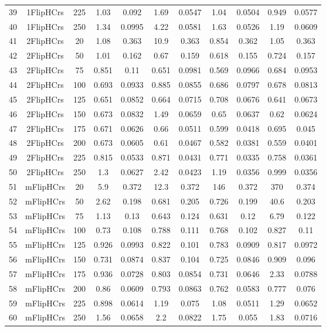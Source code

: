 \begin{table}[hbtp]
\begin{tabular}{|ccccccccccc|}
  39 & 1FlipHCrs &  225 & 1.03 & 0.092 & 1.69 & 0.0547 & 1.04 & 0.0504 & 0.949 & 0.0577 \\
  40 & 1FlipHCrs &  250 & 1.34 & 0.0995 & 4.22 & 0.0581 & 1.63 & 0.0526 & 1.19 & 0.0609 \\
  41 & 2FlipHCrs &   20 & 1.08 & 0.363 & 10.9 & 0.363 & 0.854 & 0.362 & 1.05 & 0.363 \\
  42 & 2FlipHCrs &   50 & 1.01 & 0.162 & 0.67 & 0.159 & 0.618 & 0.155 & 0.724 & 0.157 \\
  43 & 2FlipHCrs &   75 & 0.851 & 0.11 & 0.651 & 0.0981 & 0.569 & 0.0966 & 0.684 & 0.0953 \\
  44 & 2FlipHCrs &  100 & 0.693 & 0.0933 & 0.885 & 0.0855 & 0.686 & 0.0797 & 0.678 & 0.0813 \\
  45 & 2FlipHCrs &  125 & 0.651 & 0.0852 & 0.664 & 0.0715 & 0.708 & 0.0676 & 0.641 & 0.0673 \\
  46 & 2FlipHCrs &  150 & 0.673 & 0.0832 & 1.49 & 0.0659 & 0.65 & 0.0637 & 0.62 & 0.0624 \\
  47 & 2FlipHCrs &  175 & 0.671 & 0.0626 & 0.66 & 0.0511 & 0.599 & 0.0418 & 0.695 & 0.045 \\
  48 & 2FlipHCrs &  200 & 0.673 & 0.0605 & 0.61 & 0.0467 & 0.582 & 0.0381 & 0.559 & 0.0401 \\
  49 & 2FlipHCrs &  225 & 0.815 & 0.0533 & 0.871 & 0.0431 & 0.771 & 0.0335 & 0.758 & 0.0361 \\
  50 & 2FlipHCrs &  250 &  1.3 & 0.0627 & 2.42 & 0.0423 & 1.19 & 0.0356 & 0.999 & 0.0356 \\
  51 & mFlipHCrs &   20 &  5.9 & 0.372 & 12.3 & 0.372 &  146 & 0.372 &  370 & 0.374 \\
  52 & mFlipHCrs &   50 & 2.62 & 0.198 & 0.681 & 0.205 & 0.726 & 0.199 & 40.6 & 0.203 \\
  53 & mFlipHCrs &   75 & 1.13 & 0.13 & 0.643 & 0.124 & 0.631 & 0.12 & 6.79 & 0.122 \\
  54 & mFlipHCrs &  100 & 0.73 & 0.108 & 0.788 & 0.111 & 0.768 & 0.102 & 0.827 & 0.11 \\
  55 & mFlipHCrs &  125 & 0.926 & 0.0993 & 0.822 & 0.101 & 0.783 & 0.0909 & 0.817 & 0.0972 \\
  56 & mFlipHCrs &  150 & 0.731 & 0.0874 & 0.837 & 0.104 & 0.725 & 0.0846 & 0.909 & 0.096 \\
  57 & mFlipHCrs &  175 & 0.936 & 0.0728 & 0.803 & 0.0854 & 0.731 & 0.0646 & 2.33 & 0.0788 \\
  58 & mFlipHCrs &  200 & 0.86 & 0.0609 & 0.793 & 0.0863 & 0.762 & 0.0583 & 0.777 & 0.076 \\
  59 & mFlipHCrs &  225 & 0.898 & 0.0614 & 1.19 & 0.075 & 1.08 & 0.0511 & 1.29 & 0.0652 \\
  60 & mFlipHCrs &  250 & 1.56 & 0.0658 &  2.2 & 0.0822 & 1.75 & 0.055 & 1.83 & 0.0716 \\
\hline
\end{tabular}
\end{table}
